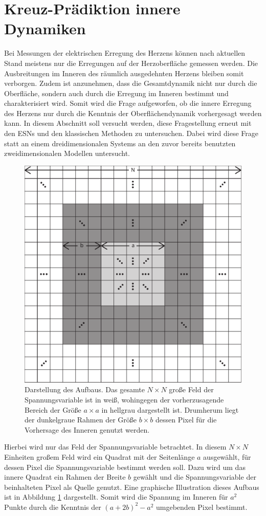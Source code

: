 \section{Kreuz-Prädiktion innere Dynamiken}
Bei Messungen der elektrischen Erregung des Herzens können nach aktuellen Stand meistens nur die Erregungen auf der Herzoberfläche gemessen werden. Die Ausbreitungen im Inneren des räumlich ausgedehnten Herzens bleiben somit verborgen. Zudem ist anzunehmen, dass die Gesamtdynamik nicht nur durch die Oberfläche, sondern auch durch die Erregung im Inneren bestimmt und charakterisiert wird. Somit wird die Frage aufgeworfen, ob die innere Erregung des Herzens nur durch die Kenntnis der Oberflächendynamik vorhergesagt werden kann. In diesem Abschnitt soll versucht werden, diese Fragestellung erneut mit den \textsc{ESN}s und den klassischen Methoden zu untersuchen. Dabei wird diese Frage statt an einem dreidimensionalen Systems an den zuvor bereits benutzten zweidimensionalen Modellen untersucht.\\

\begin{figure}[h]
	\centering
	\includegraphics[width=.4\linewidth]{figures/illustrations/inner_prediction.pdf}
	\caption{Darstellung des Aufbaus. Das gesamte $N \times N$ große Feld der Spannungsvariable ist in weiß, wohingegen der vorherzusagende Bereich der Größe $a \times a$ in hellgrau dargestellt ist. Drumherum liegt der dunkelgraue Rahmen der Größe $b \times b$ dessen Pixel für die Vorhersage des Inneren genutzt werden.}
	\label{fig:exp_inner_prediction}
\end{figure}

Hierbei wird nur das Feld der Spannungsvariable betrachtet. In diesem $N \times N$ Einheiten großem Feld wird ein Quadrat mit der Seitenlänge $a$ ausgewählt, für dessen Pixel die Spannungsvariable bestimmt werden soll. Dazu wird um das innere Quadrat ein Rahmen der Breite $b$ gewählt und die Spannungsvariable der beinhalteten Pixel als Quelle genutzt. Eine graphische Illustration dieses Aufbaus ist in Abbildung \ref{fig:exp_inner_prediction} dargestellt. Somit wird die Spannung im Inneren für $a^2$ Punkte durch die Kenntnis der $(a+2b)^2-a^2$ umgebenden Pixel bestimmt.\\

